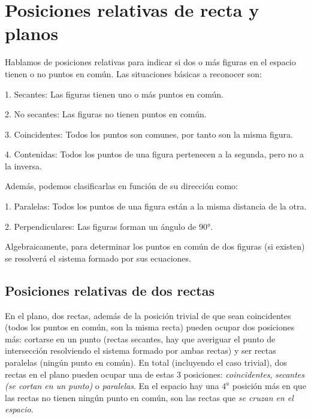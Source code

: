 \section[Posiciones relativas de recta y planos]{Posiciones relativas de recta y planos}


Hablamos de posiciones relativas para indicar si dos o más figuras en el espacio tienen o no puntos en común. Las situaciones básicas a reconocer son:

1. Secantes: Las figuras tienen uno o más puntos en común.

2. No secantes: Las figuras no tienen puntos en común.

3. Coincidentes: Todos los puntos son comunes, por tanto son la misma figura.

4. Contenidas: Todos los puntos de una figura pertenecen a la segunda, pero no a la inversa.

Además, podemos clasificarlas en función de su dirección como:

1. Paralelas: Todos los puntos de una figura están a la misma distancia de la otra.

2. Perpendiculares: Las figuras forman un ángulo de 90°.

Algebraicamente, para determinar los puntos en común de dos figuras (si existen) se resolverá el sistema formado por sus ecuaciones.

\subsection{Posiciones relativas de dos rectas}

En el plano, dos rectas, además de la posición trivial de que sean coincidentes (todos los puntos en común, son la misma recta) pueden ocupar dos posiciones más: cortarse en un punto (rectas secantes, hay que averiguar el punto de intersección resolviendo el sistema formado por ambas rectas) y ser rectas paralelas (ningún punto en común). En total (incluyendo el caso trivial), dos rectas en el plano pueden ocupar una de estas $3$ posiciones: \textit{coincidentes}, \textit{secantes (se cortan en un punto)} o \textit{paralelas}. En el espacio hay una $4^a$ posición más en que las rectas no tienen ningún punto en común, son las rectas que \textit{se cruzan en el espacio}.

